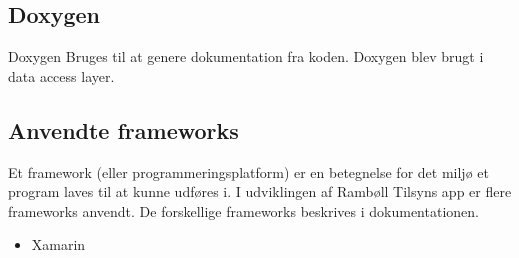 \subsection*{Doxygen}
Doxygen \cite{DoxygenInfo} Bruges til at genere dokumentation fra koden. Doxygen blev brugt i data access layer.   

\subsection*{Anvendte frameworks} 
Et framework (eller programmeringsplatform) er en betegnelse for det miljø 
et program laves til at kunne udføres i. I udviklingen af Rambøll Tilsyns app
er flere frameworks anvendt. De forskellige frameworks beskrives i dokumentationen.
\begin{itemize}[-]
	\item Xamarin \cite{XamarinDoc}
	
\end{itemize}
